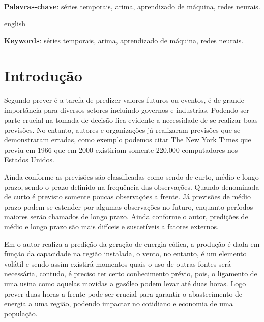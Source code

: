 \documentclass[
    12pt,
    oneside,
    a4paper,
    english,
    brazil
]{abntex2}
\begin{document}
\frenchspacing

\imprimircapa{}

\imprimirfolhaderosto{}

\begin{resumo}

    \textbf{Palavras-chave}: séries temporais, arima, aprendizado de máquina, 
    redes neurais.
\end{resumo}

\begin{resumo}[Abstract]
    \begin{otherlanguage*}{english}

        \textbf{Keywords}: séries temporais, arima, aprendizado de máquina, 
        redes neurais.
    \end{otherlanguage*}
\end{resumo}

\textual{}

\tableofcontents*
\cleardoublepage{}

\chapter{Introdução}

Segundo  prever é a tarefa de predizer valores futuros ou 
eventos, é de grande importância para diversos setores incluindo governos e 
industrias. Podendo ser parte crucial na tomada de decisão fica evidente a 
necessidade de se realizar boas previsões. No entanto, autores e organizações já 
realizaram previsões que se demonstraram erradas, como exemplo podemos citar The 
New York Times que previu em 1966 que em 2000 existiriam somente 220.000 
computadores nos Estados Unidos.

Ainda conforme  as previsões são classificadas como sendo de 
curto, médio e longo prazo, sendo o prazo definido na frequência das 
observações.  Quando denominada de curto é previsto somente poucas observações a 
frente. Já previsões de médio prazo podem se estender por algumas observações no 
futuro, enquanto períodos maiores serão chamados de longo prazo. Ainda conforme 
o autor, predições de médio e longo prazo são mais difíceis e suscetíveis a 
fatores externos.

Em  o autor realiza a predição da geração de energia 
eólica, a produção é dada em função da capacidade na região instalada, o vento, 
no entanto, é um elemento volátil e sendo assim existirá momentos quais o uso de 
outras fontes será necessária, contudo, é preciso ter certo conhecimento prévio, 
pois, o ligamento de uma usina como aquelas movidas a gasóleo podem levar até 
duas horas. Logo prever duas horas a frente pode ser crucial para garantir o 
abastecimento de energia a uma região, podendo impactar no cotidiano e economia 
de uma população.
\end{document}
